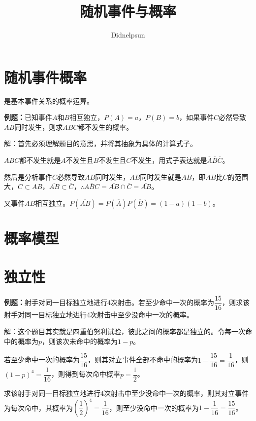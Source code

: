 \documentclass[UTF8, 12pt]{ctexart}
\author{Didnelpsun}
\title{随机事件与概率}
\date{}
\begin{document}
\maketitle
\pagestyle{empty}
\thispagestyle{empty}
\tableofcontents
\thispagestyle{empty}
\newpage
\pagestyle{plain}
\setcounter{page}{1}
\section{随机事件概率}

是基本事件关系的概率运算。

\textbf{例题：}已知事件$A$和$B$相互独立，$P(A)=a$，$P(B)=b$，如果事件$C$必然导致$AB$同时发生，则求$ABC$都不发生的概率。

解：首先必须理解题目的意思，并将其抽象为具体的计算式子。

$ABC$都不发生就是$A$不发生且$B$不发生且$C$不发生，用式子表达就是$\overline{A}\overline{B}\overline{C}$。

然后是分析事件$C$必然导致$AB$同时发生，$AB$同时发生就是$AB$，即$AB$比$C$的范围大，$C\subset AB$，$\overline{AB}\subset\overline{C}$，$\therefore\overline{ABC}=\overline{AB}\cap\overline{C}=\overline{AB}$。

又事件$AB$相互独立。$P(\overline{AB})=P(\overline{A})P(\overline{B})=(1-a)(1-b)$。

\section{概率模型}

\section{独立性}

\textbf{例题：}射手对同一目标独立地进行4次射击。若至少命中一次的概率为$\dfrac{15}{16}$，则求该射手对同一目标独立地进行4次射击中至少没命中一次的概率。

解：这个题目其实就是四重伯努利试验，彼此之间的概率都是独立的。令每一次命中的概率为$p$，则该次未命中的概率为$1-p$。

若至少命中一次的概率为$\dfrac{15}{16}$，则其对立事件全部不命中的概率为$1-\dfrac{15}{16}=\dfrac{1}{16}$，则$(1-p)^4=\dfrac{1}{16}$，则得到每次命中概率$p=\dfrac{1}{2}$。

求该射手对同一目标独立地进行4次射击中至少没命中一次的概率，则其对立事件为每次命中，其概率为$\left(\dfrac{1}{2}\right)^4=\dfrac{1}{16}$，则至少没命中一次的概率为$1-\dfrac{1}{16}=\dfrac{15}{16}$。
\end{document}
